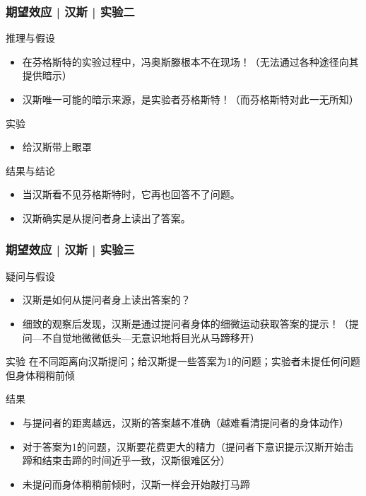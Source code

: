 \begin{frame}
  \frametitle{期望效应 | 汉斯 | 实验二}
  \begin{block}{推理与假设}
    \begin{itemize}
      \item 在芬格斯特的实验过程中，冯\textbullet 奥斯滕根本不在现场！（无法通过各种途径向其提供暗示）
      \item 汉斯唯一可能的暗示来源，是实验者芬格斯特！（而芬格斯特对此一无所知）
    \end{itemize}
  \end{block}
  \pause
  \begin{block}{实验}
    \begin{itemize}
      \item 给汉斯带上眼罩
    \end{itemize}
  \end{block}
  \pause
  \begin{block}{结果与结论}
    \begin{itemize}
      \item 当汉斯看不见芬格斯特时，它再也回答不了问题。
      \item 汉斯确实是从提问者身上读出了答案。
    \end{itemize}
  \end{block}
\end{frame}

\begin{frame}
  \frametitle{期望效应 | 汉斯 | 实验三}
  \begin{block}{疑问与假设}
    \begin{itemize}
      \item 汉斯是如何从提问者身上读出答案的？
      \item 细致的观察后发现，汉斯是通过提问者身体的细微运动获取答案的提示！（提问—不自觉地微微低头—无意识地将目光从马蹄移开）
    \end{itemize}
  \end{block}
  \vspace{-0.4em}
  \pause
  \begin{block}{实验}
      在不同距离向汉斯提问；给汉斯提一些答案为1的问题；实验者未提任何问题但身体稍稍前倾
  \end{block}
  \vspace{-0.4em}
  \pause
  \begin{block}{结果}
    \begin{itemize}
      \item 与提问者的距离越远，汉斯的答案越不准确（越难看清提问者的身体动作）
      \item 对于答案为1的问题，汉斯要花费更大的精力（提问者下意识提示汉斯开始击蹄和结束击蹄的时间近乎一致，汉斯很难区分）
      \item 未提问而身体稍稍前倾时，汉斯一样会开始敲打马蹄
    \end{itemize}
  \end{block}
\end{frame}

